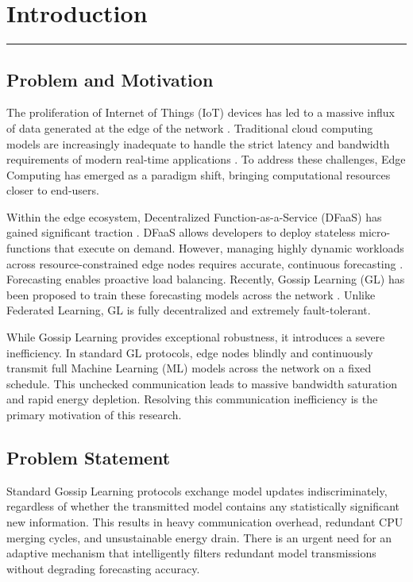 \chapter{Introduction}
\noindent \rule{6.6in}{0.01in}
\vspace{0.2cm}

\section{Problem and Motivation}
The proliferation of Internet of Things (IoT) devices has led to a massive influx of data generated at the edge of the network \cite{mach2017mobile}. Traditional cloud computing models are increasingly inadequate to handle the strict latency and bandwidth requirements of modern real-time applications \cite{shi2016edge}. To address these challenges, Edge Computing has emerged as a paradigm shift, bringing computational resources closer to end-users.

Within the edge ecosystem, Decentralized Function-as-a-Service (DFaaS) has gained significant traction \cite{ciavotta2021edge}. DFaaS allows developers to deploy stateless micro-functions that execute on demand. However, managing highly dynamic workloads across resource-constrained edge nodes requires accurate, continuous forecasting \cite{baccarelli2017fog}. Forecasting enables proactive load balancing. Recently, Gossip Learning (GL) has been proposed to train these forecasting models across the network \cite{tundo2025decentralized}. Unlike Federated Learning, GL is fully decentralized and extremely fault-tolerant.

While Gossip Learning provides exceptional robustness, it introduces a severe inefficiency. In standard GL protocols, edge nodes blindly and continuously transmit full Machine Learning (ML) models across the network on a fixed schedule. This unchecked communication leads to massive bandwidth saturation and rapid energy depletion. Resolving this communication inefficiency is the primary motivation of this research.

\section{Problem Statement}
Standard Gossip Learning protocols exchange model updates indiscriminately, regardless of whether the transmitted model contains any statistically significant new information. This results in heavy communication overhead, redundant CPU merging cycles, and unsustainable energy drain. There is an urgent need for an adaptive mechanism that intelligently filters redundant model transmissions without degrading forecasting accuracy.

